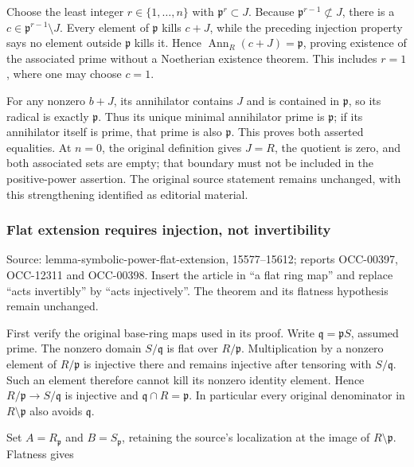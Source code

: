 Choose the least integer \(r\in\{1,\ldots,n\}\) with \(\mathfrak p^r\subset J\). Because \(\mathfrak p^{r-1}\not\subset J\), there is a \(c\in\mathfrak p^{r-1}\setminus J\). Every element of \(\mathfrak p\) kills \(c+J\), while the preceding injection property says no element outside \(\mathfrak p\) kills it. Hence \(\operatorname{Ann}_R(c+J)=\mathfrak p\), proving existence of the associated prime without a Noetherian existence theorem. This includes \(r=1\), where one may choose \(c=1\).

For any nonzero \(b+J\), its annihilator contains \(J\) and is contained in \(\mathfrak p\), so its radical is exactly \(\mathfrak p\). Thus its unique minimal annihilator prime is \(\mathfrak p\); if its annihilator itself is prime, that prime is also \(\mathfrak p\). This proves both asserted equalities. At \(n=0\), the original definition gives \(J=R\), the quotient is zero, and both associated sets are empty; that boundary must not be included in the positive-power assertion. The original source statement remains unchanged, with this strengthening identified as editorial material.

\subsubsection{Flat extension requires injection, not invertibility}\label{algebra-proof-005-flat-extension-requires-injection-not-invertibility}

Source: lemma-symbolic-power-flat-extension, 15577--15612; reports OCC-00397, OCC-12311 and OCC-00398. Insert the article in ``a flat ring map'' and replace ``acts invertibly'' by ``acts injectively''. The theorem and its flatness hypothesis remain unchanged.

First verify the original base-ring maps used in its proof. Write \(\mathfrak q=\mathfrak pS\), assumed prime. The nonzero domain \(S/\mathfrak q\) is flat over \(R/\mathfrak p\). Multiplication by a nonzero element of \(R/\mathfrak p\) is injective there and remains injective after tensoring with \(S/\mathfrak q\). Such an element therefore cannot kill its nonzero identity element. Hence \(R/\mathfrak p\to S/\mathfrak q\) is injective and \(\mathfrak q\cap R=\mathfrak p\). In particular every original denominator in \(R\setminus\mathfrak p\) also avoids \(\mathfrak q\).

Set \(A=R_{\mathfrak p}\) and \(B=S_{\mathfrak p}\), retaining the source's localization at the image of \(R\setminus\mathfrak p\). Flatness gives

